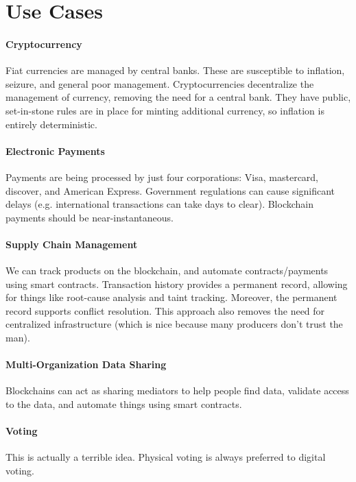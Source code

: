 \section{Use Cases}
\paragraph{Cryptocurrency} Fiat currencies are managed by central banks. These are susceptible to inflation, seizure, and general poor management. Cryptocurrencies decentralize the management of currency, removing the need for a central bank. They have public, set-in-stone rules are in place for minting additional currency, so inflation is entirely deterministic.

\paragraph{Electronic Payments} Payments are being processed by just four corporations: Visa, mastercard, discover, and American Express. Government regulations can cause significant delays (e.g. international transactions can take days to clear). Blockchain payments should be near-instantaneous.

\paragraph{Supply Chain Management} We can track products on the blockchain, and automate contracts/payments using smart contracts. Transaction history provides a permanent record, allowing for things like root-cause analysis and taint tracking. Moreover, the permanent record supports conflict resolution. This approach also removes the need for centralized infrastructure (which is nice because many producers don't trust the man).

\paragraph{Multi-Organization Data Sharing} Blockchains can act as sharing mediators to help people find data, validate access to the data, and automate things using smart contracts.

\paragraph{Voting} This is actually a terrible idea. Physical voting is always preferred to digital voting.
